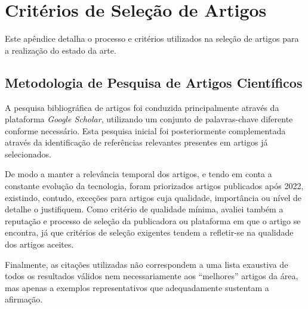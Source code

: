\chapter{Critérios de Seleção de Artigos}
\label{chap:appendix-selection-criteria}

\begin{introduction}
Este apêndice detalha o processo e critérios utilizados na seleção de artigos para a realização do estado da arte.
\end{introduction}

\section{Metodologia de Pesquisa de Artigos Científicos}

A pesquisa bibliográfica de artigos foi conduzida principalmente através da plataforma \textit{Google Scholar}, utilizando um conjunto de palavras-chave diferente conforme necessário. Esta pesquisa inicial foi posteriormente complementada através da identificação de referências relevantes presentes em artigos já selecionados.

De modo a manter a relevância temporal dos artigos, e tendo em conta a constante evolução da tecnologia, foram priorizados artigos publicados após 2022, existindo, contudo, exceções para artigos cuja qualidade, importância ou nível de detalhe o justifiquem. 
Como critério de qualidade mínima, avaliei também a reputação e processo de seleção da publicadora ou plataforma em que o artigo se encontra, já que critérios de seleção exigentes tendem a refletir-se na qualidade dos artigos aceites.

Finalmente, as citações utilizadas não correspondem a uma lista exaustiva de todos os resultados válidos nem necessariamente aos ``melhores'' artigos da área, mas apenas a exemplos representativos que adequadamente sustentam a afirmação.
